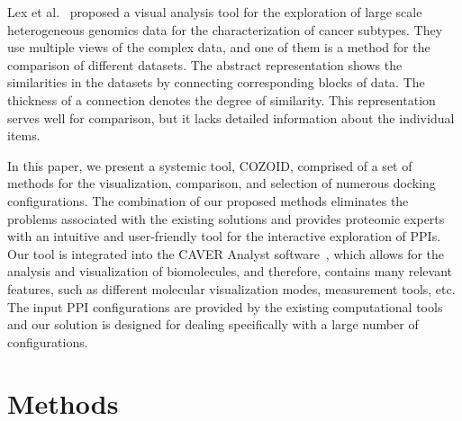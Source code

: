 \documentclass{bmcart}
\def\MatView {Matrix view\xspace}
\begin{document}
Lex et al.~\cite{Lex2012} proposed a visual analysis tool for the exploration of large scale heterogeneous genomics data for the characterization of cancer subtypes.
They use multiple views of the complex data, and one of them is a method for the comparison of different datasets.
The abstract representation shows the similarities in the datasets by connecting corresponding blocks of data. 
The thickness of a connection denotes the degree of similarity. 
This representation serves well for comparison, but it lacks detailed information about the individual items.


In this paper, we present a systemic tool, COZOID, comprised of a set of methods for the visualization, comparison, and selection of numerous docking configurations.
The combination of our proposed methods eliminates the problems associated with the existing solutions and provides proteomic experts with an intuitive and user-friendly tool for the interactive exploration of PPIs.
Our tool is integrated into the CAVER Analyst software~\cite{kozlikova2014caver}, which allows for the analysis and visualization of biomolecules, and therefore, contains many relevant features, such as different molecular visualization modes, measurement tools, etc.  
The input PPI configurations are provided by the existing computational tools and our solution is designed for dealing specifically with a large number of configurations.

\section*{Methods}
\end{document}
